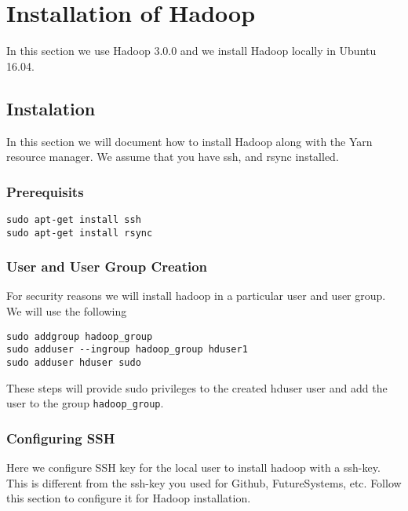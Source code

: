 \section{Installation of Hadoop}\label{hadoop-local-installation}

In this section we use Hadoop 3.0.0 and we install Hadoop locally in
Ubuntu 16.04.

\subsection{Instalation}

In this section we will document how to install Hadoop along with the Yarn
resource manager. We assume that you have ssh, and rsync installed.

\subsubsection{Prerequisits}

\begin{lstlisting}
sudo apt-get install ssh
sudo apt-get install rsync
\end{lstlisting}

\subsubsection{User and User Group Creation}

For security reasons we will install hadoop in a particular user and
user group. We will use the following

\begin{lstlisting}
sudo addgroup hadoop_group
sudo adduser --ingroup hadoop_group hduser1
sudo adduser hduser sudo
\end{lstlisting}


These steps will provide sudo privileges to the created hduser
user and add the user to the group \verb|hadoop_group|.

\subsubsection{Configuring SSH}

\begin{NOTE}
  Here we configure SSH key for the local user to install hadoop with a ssh-key.
  This is different from the ssh-key you used for Github, FutureSystems, etc.
  Follow this section to configure it for Hadoop installation. 
\end{NOTE}

